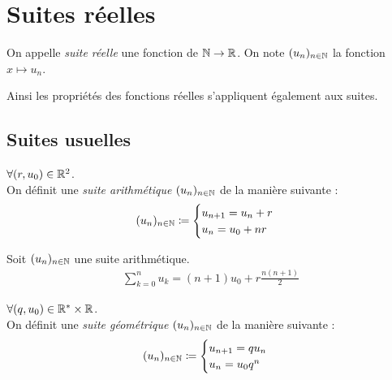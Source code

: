 \chapter{Suites réelles}
\begin{definition}
    On appelle \emph{suite réelle} une fonction de $\mathbb{N} \to \mathbb{R}$. 
    On note $(u_n)_{n \in \mathbb{N}}$ la fonction $x \mapsto u_n$.
\end{definition}

\begin{remark}
    Ainsi les propriétés des fonctions réelles s'appliquent également aux suites.
\end{remark}

\section{Suites usuelles}
\begin{definition}
    $\forall (r, u_0) \in \mathbb{R}^2$. 
    \\
    On définit une \emph{suite arithmétique} $(u_n)_{n \in \mathbb{N}}$ de la manière suivante :
    \begin{align*}
        (u_n)_{n \in \mathbb{N}} \coloneqq
        \begin{cases}
            u_{n+1} = u_n + r \\ 
            u_n = u_0 + nr
        \end{cases}
    \end{align*}
\end{definition}

\begin{proposition}
    Soit $(u_n)_{n \in \mathbb{N}}$ une suite arithmétique.
    \begin{align*}
        \sum_{k = 0}^{n} u_k = (n+1)u_0 + r \frac{n(n+1)}{2}
    \end{align*}
\end{proposition}

\begin{definition}
    $\forall (q, u_0) \in \mathbb{R}^* \times \mathbb{R}$. 
    \\
    On définit une \emph{suite géométrique} $(u_n)_{n \in \mathbb{N}}$ de la manière suivante : 
    \begin{align*}
        (u_n)_{n \in \mathbb{N}} \coloneqq 
        \begin{cases}
            u_{n+1} = qu_n \\
            u_n = u_0 q^n
        \end{cases}
    \end{align*}
\end{definition}

